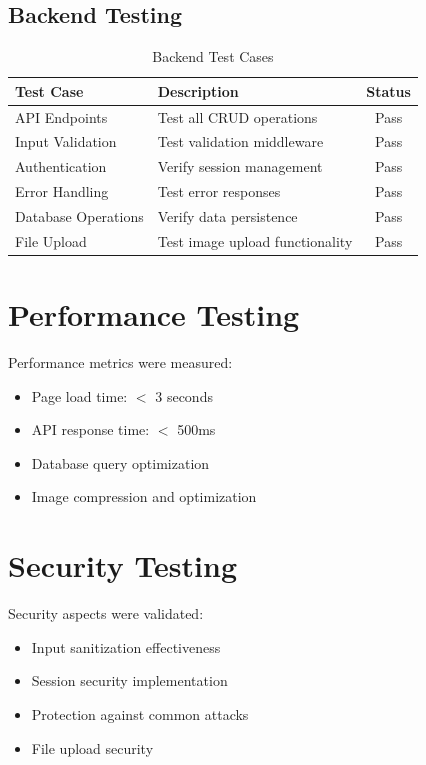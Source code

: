 \documentclass[12pt,a4paper]{report}
\begin{document}
\subsection{Backend Testing}
\begin{table}[h]
    \centering
    \begin{tabular}{|l|p{6cm}|c|}
        \hline
        \textbf{Test Case} & \textbf{Description} & \textbf{Status} \\
        \hline
        API Endpoints & Test all CRUD operations & Pass \\
        Input Validation & Test validation middleware & Pass \\
        Authentication & Verify session management & Pass \\
        Error Handling & Test error responses & Pass \\
        Database Operations & Verify data persistence & Pass \\
        File Upload & Test image upload functionality & Pass \\
        \hline
    \end{tabular}
    \caption{Backend Test Cases}
    \label{tab:backend_tests}
\end{table}

\section{Performance Testing}
Performance metrics were measured:
\begin{itemize}
    \item Page load time: $<$ 3 seconds
    \item API response time: $<$ 500ms
    \item Database query optimization
    \item Image compression and optimization
\end{itemize}

\section{Security Testing}
Security aspects were validated:
\begin{itemize}
    \item Input sanitization effectiveness
    \item Session security implementation
    \item Protection against common attacks
    \item File upload security
\end{itemize}
\end{document}
